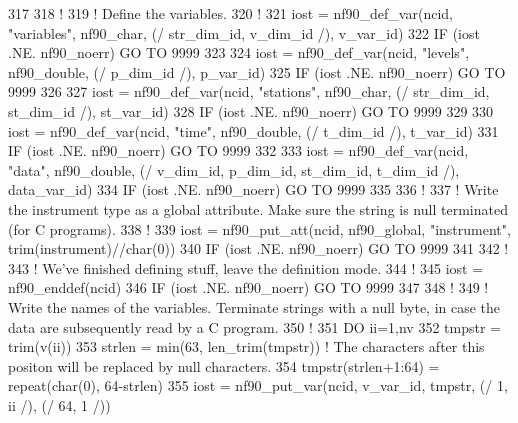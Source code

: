 \begin{DoxyCode}
317 
318     \textcolor{comment}{!}
319     \textcolor{comment}{! Define the variables.}
320     \textcolor{comment}{!}
321     iost    = nf90\_def\_var(ncid, \textcolor{stringliteral}{"variables"}, nf90\_char, (/ str\_dim\_id, v\_dim\_id /), v\_var\_id)
322     \textcolor{keywordflow}{IF} (iost .NE. nf90\_noerr) \textcolor{keywordflow}{GO TO} 9999
323 
324     iost    = nf90\_def\_var(ncid, \textcolor{stringliteral}{"levels"}, nf90\_double, (/ p\_dim\_id /), p\_var\_id)
325     \textcolor{keywordflow}{IF} (iost .NE. nf90\_noerr) \textcolor{keywordflow}{GO TO} 9999
326 
327     iost    = nf90\_def\_var(ncid, \textcolor{stringliteral}{"stations"}, nf90\_char, (/ str\_dim\_id, st\_dim\_id /), st\_var\_id)
328     \textcolor{keywordflow}{IF} (iost .NE. nf90\_noerr) \textcolor{keywordflow}{GO TO} 9999
329 
330     iost    = nf90\_def\_var(ncid, \textcolor{stringliteral}{"time"}, nf90\_double, (/ t\_dim\_id /), t\_var\_id)
331     \textcolor{keywordflow}{IF} (iost .NE. nf90\_noerr) \textcolor{keywordflow}{GO TO} 9999
332 
333     iost    = nf90\_def\_var(ncid, \textcolor{stringliteral}{"data"}, nf90\_double, (/ v\_dim\_id, p\_dim\_id, st\_dim\_id, t\_dim\_id /), 
      data\_var\_id)
334     \textcolor{keywordflow}{IF} (iost .NE. nf90\_noerr) \textcolor{keywordflow}{GO TO} 9999
335 
336     \textcolor{comment}{!}
337     \textcolor{comment}{! Write the instrument type as a global attribute. Make sure the string is null terminated (for C
       programs).}
338     \textcolor{comment}{!}
339     iost    = nf90\_put\_att(ncid, nf90\_global, \textcolor{stringliteral}{"instrument"}, trim(instrument)//char(0))
340     \textcolor{keywordflow}{IF} (iost .NE. nf90\_noerr) \textcolor{keywordflow}{GO TO} 9999
341 
342     \textcolor{comment}{!}
343     \textcolor{comment}{! We've finished defining stuff, leave the definition mode.}
344     \textcolor{comment}{!}
345     iost    = nf90\_enddef(ncid)
346     \textcolor{keywordflow}{IF} (iost .NE. nf90\_noerr) \textcolor{keywordflow}{GO TO} 9999
347 
348     \textcolor{comment}{!}
349     \textcolor{comment}{! Write the names of the variables. Terminate strings with a null byte, in case the data are
       subsequently read by a C program.}
350     \textcolor{comment}{!}
351     \textcolor{keywordflow}{DO} ii=1,nv
352         tmpstr  = trim(v(ii))
353         strlen  = min(63, len\_trim(tmpstr))           \textcolor{comment}{! The characters after this positon will be replaced
       by null characters.}
354         tmpstr(strlen+1:64)    = repeat(char(0), 64-strlen)
355         iost    = nf90\_put\_var(ncid, v\_var\_id, tmpstr, (/ 1, ii /), (/ 64, 1 /))

\end{DoxyCode}
